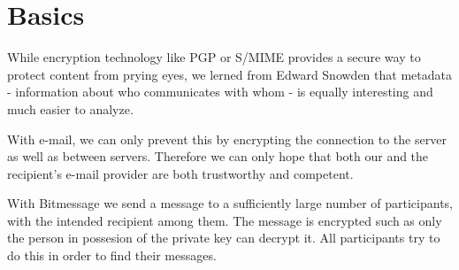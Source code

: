  \section{Basics}

  While encryption technology like PGP or S/MIME provides a secure way to protect content from prying eyes, we lerned from Edward Snowden that metadata - information about who communicates with whom - is equally interesting and much easier to analyze.

  With e-mail, we can only prevent this by encrypting the connection to the server as well as between servers. Therefore we can only hope that both our and the recipient's e-mail provider are both trustworthy and competent.

  With Bitmessage we send a message to a sufficiently large number of participants, with the intended recipient among them. The message is encrypted such as only the person in possesion of the private key can decrypt it. All participants try to do this in order to find their messages.